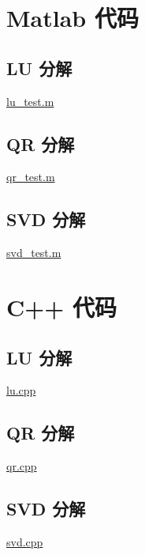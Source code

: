 \chapter{Matlab 代码}
\section{LU 分解}
\href{https://github.com/HenryZhuHR/Matrix-Theory-Assignment/blob/main/matlab/lu\_test.m}{lu\_test.m}


\section{QR 分解}
\href{https://github.com/HenryZhuHR/Matrix-Theory-Assignment/blob/main/matlab/qr\_test.m}{qr\_test.m}


\section{SVD 分解}
\href{https://github.com/HenryZhuHR/Matrix-Theory-Assignment/blob/main/matlab/svd\_test.m}{svd\_test.m}


\chapter{C++ 代码}
\section{LU 分解}
\href{https://github.com/HenryZhuHR/Matrix-Theory-Assignment/blob/main/cpp/app/lu.cpp}{lu.cpp}


\section{QR 分解}
\href{https://github.com/HenryZhuHR/Matrix-Theory-Assignment/blob/main/cpp/app/qr.cpp}{qr.cpp}


\section{SVD 分解}
\href{https://github.com/HenryZhuHR/Matrix-Theory-Assignment/blob/main/cpp/app/svd.cpp}{svd.cpp}
